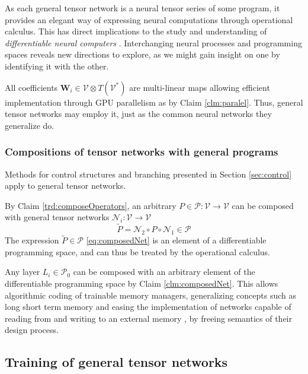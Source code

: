 \documentclass[smallcondensed]{svjour3}
\newcommand{\bfW}{\mathbf{W}}
\newcommand{\VV}{\mathcal{V}}
\newcommand{\NN}{\mathcal{N}}
\newcommand{\dP}{\mathcal{P}}
\begin{document}
As each general tensor network is a neural tensor series of some program, it
provides an elegant way of expressing neural computations through operational
calculus.  
This has direct implications to the study and understanding of
\emph{differentiable neural computers} \cite{netRam}. Interchanging neural
processes and programming spaces reveals new directions to explore, as we might
gain insight on one by identifying it with the other. 
 

\begin{remark}
All coefficients $\bfW_i\in \VV\otimes T(\VV^*)$ are multi-linear maps allowing efficient implementation through GPU parallelism as by Claim \ref{clm:paralel}. Thus, general tensor networks may employ it, just as the common neural networks they generalize do.
\end{remark}

\subsubsection{Compositions of tensor networks with general programs}\label{sec:compoNetProg}

Methods for control structures and branching presented in Section
\ref{sec:control} apply to general tensor networks. 
\begin{proposition}\label{clm:composedNet}
By Claim \ref{trd:composeOperators}, an arbitrary $P\in\dP:\VV\to\VV$ can be composed with general tensor networks $\NN_i:\VV\to\VV$ 
\begin{equation}\label{eq:composedNet}
\tilde{P}=\NN_2\circ P\circ\NN_1 \in \dP
\end{equation}
The expression $\tilde{P}\in\dP$ \eqref{eq:composedNet} is an element of a differentiable programming space, and can thus be treated by the operational calculus. 
\end{proposition}

\begin{remark}
Any layer $L_i\in\dP_0$ can be composed with an arbitrary element of the differentiable programming space by Claim  \ref{clm:composedNet}. This allows algorithmic coding of trainable memory managers, generalizing concepts such as long short term memory \cite{LSTM} and easing the implementation of networks capable of reading from and writing to an external memory \cite{netRam}, by freeing semantics of their design process.
\end{remark}

\subsection{Training of general tensor networks}\label{sec:trainNet}
\end{document}
